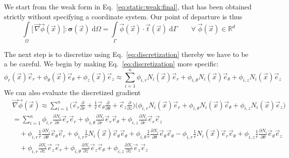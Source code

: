 \documentclass[times,namecite]{goose-article}
\begin{document}
We start from the weak form in Eq.~\eqref{eq:static:weak:final}, that has been obtained strictly without specifying a coordinate system. Our point of departure is thus
\begin{equation}
  \int\limits_\Omega
    \big[\, \vec{\nabla} \vec{\phi}(\vec{x}) \,\big] : \bm{\sigma}(\vec{x}) \;
  \mathrm{d}\Omega
  =
  \int\limits_\Gamma
    \vec{\phi}(\vec{x}) \cdot \vec{t}(\vec{x}) \;
  \mathrm{d}\Gamma
  \qquad
  \forall \; \vec{\phi}(\vec{x}) \in \mathbb{R}^d
\end{equation}

The next step is to discretize using Eq.~\eqref{eq:discretization} thereby we have to be a be careful. We begin by making Eq.~\eqref{eq:discretization} more specific:
\begin{equation}
  \phi_r (\vec{x}) \vec{e}_r + \phi_\theta (\vec{x}) \vec{e}_\theta + \phi_z (\vec{x}) \vec{e}_z
  \approx
  \sum\limits_{i=1}^{n}
  \phi_{i,r} N_i (\vec{x}) \vec{e}_r +
  \phi_{i,\theta}  N_i (\vec{x}) \vec{e}_\theta +
  \phi_{i,z}  N_i (\vec{x}) \vec{e}_z
\end{equation}
We can also evaluate the discretized gradient
\begin{align}
  &\vec{\nabla} \vec{\phi} (\vec{x})
  \approx
  \sum\limits_{i=1}^{n}
  \bigg(
  \vec{e}_r \frac{\partial}{\partial r} +
  \frac{1}{r} \vec{e}_\theta \frac{\partial}{\partial \theta} +
  \vec{e}_z \frac{\partial}{\partial z}
  \bigg)
  \bigg(
  \phi_{i,r} N_i (\vec{x}) \vec{e}_r +
  \phi_{i,\theta}  N_i (\vec{x}) \vec{e}_\theta +
  \phi_{i,z}  N_i (\vec{x}) \vec{e}_z
  \bigg)
  \\
  &=
  \sum\limits_{i=1}^{n}
    \phi_{i,r     } \frac{\partial N_i}{\partial r} \vec{e}_r \vec{e}_r
  + \phi_{i,\theta} \frac{\partial N_i}{\partial r} \vec{e}_r \vec{e}_\theta
  + \phi_{i,z     } \frac{\partial N_i}{\partial r} \vec{e}_r \vec{e}_z
  \nonumber
  \\
  &\quad
  + \phi_{i,r     } \frac{1}{r} \frac{\partial N_i }{\partial \theta} \vec{e}_\theta \vec{e}_r
  + \phi_{i,r     } \frac{1}{r} N_i (\vec{x}) \vec{e}_\theta \vec{e}_\theta
  + \phi_{i,\theta} \frac{1}{r} \frac{\partial N_i }{\partial \theta} \vec{e}_\theta \vec{e}_\theta
  - \phi_{i,r} \frac{1}{r} N_i (\vec{x}) \vec{e}_r \vec{e}_\theta
  + \phi_{i,z     } \frac{1}{r} \frac{\partial N_i }{\partial \theta} \vec{e}_\theta \vec{e}_z
  \nonumber
  \\
  &\quad
  + \phi_{i,r     } \frac{\partial N_i }{\partial z} \vec{e}_z \vec{e}_r
  + \phi_{i,\theta} \frac{\partial N_i }{\partial z} \vec{e}_z \vec{e}_\theta
  + \phi_{i,z     } \frac{\partial N_i }{\partial z} \vec{e}_z \vec{e}_z
\end{align}
\end{document}
